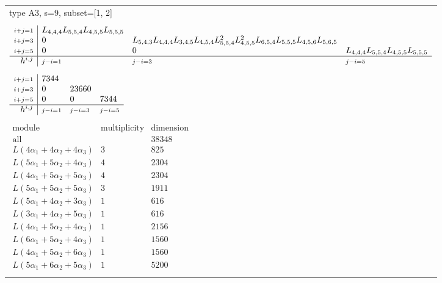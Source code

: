 \documentclass[crop,border=2mm]{standalone}
\begin{document}
\begin{tabular}{l}
{\huge type A3, s=9, subset=[1, 2]}\\ \\


$\displaystyle
\begin{array}{r|l l l}
	{\scriptstyle i+j=1}&L_{4,4,4}L_{5,5,4}L_{4,5,5}L_{5,5,5}&&\\
	{\scriptstyle i+j=3}&0&L_{5,4,3}L_{4,4,4}L_{3,4,5}L_{4,5,4}L_{5,5,4}^{2}L_{4,5,5}^{2}L_{6,5,4}L_{5,5,5}L_{4,5,6}L_{5,6,5}&\\
	{\scriptstyle i+j=5}&0&0&L_{4,4,4}L_{5,5,4}L_{4,5,5}L_{5,5,5}\\
	\hline h^{i,j}&{\scriptstyle j-i=1}&{\scriptstyle j-i=3}&{\scriptstyle j-i=5}
\end{array}
$ \\ \\


$\displaystyle
\begin{array}{r|l l l}
	{\scriptstyle i+j=1}&7344&&\\
	{\scriptstyle i+j=3}&0&23660&\\
	{\scriptstyle i+j=5}&0&0&7344\\
	\hline h^{i,j}&{\scriptstyle j-i=1}&{\scriptstyle j-i=3}&{\scriptstyle j-i=5}
\end{array}
$ \\ \\


$\displaystyle
\begin{array}{rll}
	\text{module}&\text{multiplicity}&\text{dimension} \\ \hline \text{all}&&38348 \\
	L\left( 4\alpha_{1}+ 4\alpha_{2}+ 4\alpha_{3}\right)&3&825\\
	L\left( 5\alpha_{1}+ 5\alpha_{2}+ 4\alpha_{3}\right)&4&2304\\
	L\left( 4\alpha_{1}+ 5\alpha_{2}+ 5\alpha_{3}\right)&4&2304\\
	L\left( 5\alpha_{1}+ 5\alpha_{2}+ 5\alpha_{3}\right)&3&1911\\
	L\left( 5\alpha_{1}+ 4\alpha_{2}+ 3\alpha_{3}\right)&1&616\\
	L\left( 3\alpha_{1}+ 4\alpha_{2}+ 5\alpha_{3}\right)&1&616\\
	L\left( 4\alpha_{1}+ 5\alpha_{2}+ 4\alpha_{3}\right)&1&2156\\
	L\left( 6\alpha_{1}+ 5\alpha_{2}+ 4\alpha_{3}\right)&1&1560\\
	L\left( 4\alpha_{1}+ 5\alpha_{2}+ 6\alpha_{3}\right)&1&1560\\
	L\left( 5\alpha_{1}+ 6\alpha_{2}+ 5\alpha_{3}\right)&1&5200
\end{array}
$ \\ \\

\end{tabular}
\end{document}
